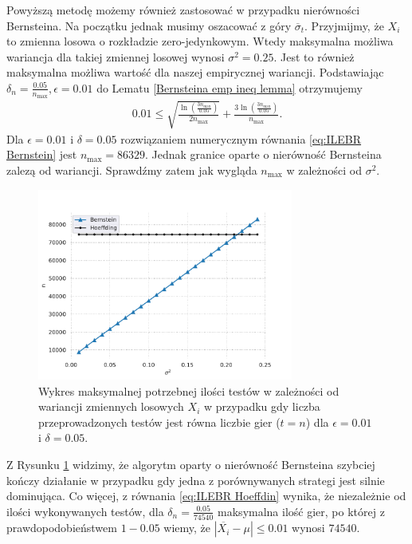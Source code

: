 \documentclass[inzynierska]{pwr_wmat_praca_dyplomowa}
\theoremstyle{plain}
\numberwithin{theorem}{chapter}
\theoremstyle{definition}
\numberwithin{theorem}{chapter}
\newcommand{\nmax}{n_{\text{max}}}
\begin{document}
	Powyższą metodę możemy również zastosować w przypadku nierówności Bernsteina.
	Na początku jednak musimy oszacować z góry $\overline{\sigma}_t$.
	Przyjmijmy, że $X_i$ to zmienna losowa o rozkładzie zero-jedynkowym.
	Wtedy maksymalna możliwa wariancja dla takiej zmiennej losowej wynosi $\sigma^2 = 0.25$. Jest to również maksymalna możliwa wartość dla naszej empirycznej wariancji. Podstawiając $\delta_{n} = \frac{0.05}{\nmax}, \epsilon = 0.01$ do Lematu \ref{Bernsteina emp ineq lemma} otrzymujemy
	\begin{gather}
		\label{eq:ILEBR Bernstein}
		0.01 \le \sqrt{\frac{\ln(\frac{3\nmax}{0.05})}{2\nmax}} + \frac{3  \ln(\frac{3\nmax}{0.05})}{\nmax}.
	\end{gather}
	Dla $\epsilon=0.01$ i $\delta=0.05$ rozwiązaniem numerycznym równania \eqref{eq:ILEBR Bernstein} jest $\nmax=86329$. Jednak granice oparte o nierówność Bernsteina zalezą od wariancji. Sprawdźmy zatem jak wygląda $\nmax$ w zależności od $\sigma^2$.
	\begin{figure}
		\centering
		\includegraphics[width=0.75\textwidth]{imagens/t_eq_n.pdf}
		\caption{Wykres maksymalnej potrzebnej ilości testów w zależności od wariancji zmiennych losowych  $X_i$ w przypadku gdy liczba przeprowadzonych testów jest równa liczbie gier ($t = n$) dla $\epsilon=0.01$ i $\delta = 0.05$.}
		\label{fig:t_eq_n}
	\end{figure}
	Z Rysunku \ref{fig:t_eq_n} widzimy, że algorytm oparty o nierówność Bernsteina szybciej kończy działanie w przypadku gdy jedna z porównywanych strategi jest silnie dominująca. Co więcej, z równania \eqref{eq:ILEBR Hoeffdin} wynika, że niezależnie od ilości wykonywanych testów, dla $\delta_n = \frac{0.05}{74540}$ maksymalna ilość gier, po której z prawdopodobieństwem $1-0.05$ wiemy, że $|\overline{X_i} - \mu| \le 0.01$ wynosi $74540$. 
	
\end{document}
